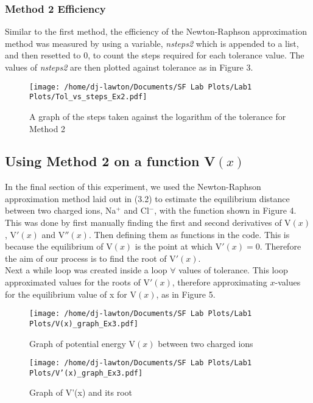\documentclass{article}
\begin{document}
\subsubsection{Method 2 Efficiency}
Similar to the first method, the efficiency of the Newton-Raphson approximation method was measured by using a variable, \textit{nsteps2} which is appended to a list, and then resetted to 0, to count the steps required for each tolerance value. The values of \textit{nsteps2} are then plotted against tolerance as in Figure 3.

\begin{figure}[h]
\begin{flushleft}
	\texttt{[image: /home/dj-lawton/Documents/SF Lab Plots/Lab1 Plots/Tol\_vs\_steps\_Ex2.pdf]}
	\caption{A graph of the steps taken against the logarithm of the tolerance for Method 2}
\end{flushleft}
\label{fig:nsteps2}
\end{figure}

\subsection{Using Method 2 on a function V$(x)$}
In the final section of this experiment, we used the Newton-Raphson approximation method laid out in (3.2) to estimate the equilibrium distance between two charged ions, Na$^+$ and Cl$^-$, with the function shown in Figure 4.\\
\indent This was done by first manually finding the first and second derivatives of V$(x)$, V$'(x)$ and V$''(x)$. Then defining them as functions in the code. This is because the equilibrium of V$(x)$ is the point at which $\mathrm{V}'(x) =0$. Therefore the aim of our process is to find the root of $\mathrm{V}'(x)$.\\
\indent Next a while loop was created inside a loop $\forall$ values of tolerance. This loop approximated values for the roots of $\mathrm{V}'(x)$, therefore approximating $x$-values for the equilibrium value of x for $\mathrm{V}(x)$, as in Figure 5.\\
\newpage
\begin{figure}[H]
\begin{flushleft}
	\texttt{[image: /home/dj-lawton/Documents/SF Lab Plots/Lab1 Plots/V(x)\_graph\_Ex3.pdf]}
	\caption{Graph of potential energy V$(x)$ between two charged ions}
	\label{fig:V(x)}
\end{flushleft}
\end{figure}
\begin{figure}[H]
\begin{flushleft}
	\texttt{[image: /home/dj-lawton/Documents/SF Lab Plots/Lab1 Plots/V'(x)\_graph\_Ex3.pdf]}
	\caption{Graph of V'(x) and its root}
	\label{fig:V'(x)}
\end{flushleft}
\end{figure}
\newpage
\end{document}
